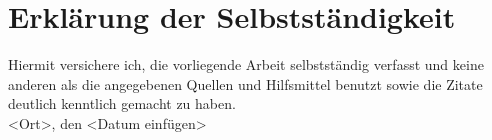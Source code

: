 \thispagestyle{empty}
\chapter*{Erklärung der Selbstständigkeit}
%
Hiermit versichere ich, die vorliegende Arbeit selbstständig verfasst und keine anderen als die angegebenen Quellen und Hilfsmittel benutzt sowie die Zitate deutlich kenntlich gemacht zu haben.
%
\vspace{4\baselineskip}\\
%
<Ort>, den <Datum einfügen> 
%
\vspace{4\baselineskip}\\
\clearpage
\mbox{}\thispagestyle{empty}

